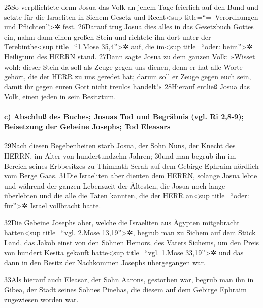 25So verpflichtete denn Josua das Volk an jenem Tage feierlich auf den
Bund und setzte für die Israeliten in Sichem Gesetz und
Recht\textless sup title=``=~Verordnungen und Pflichten''\textgreater✲
fest. 26Darauf trug Josua dies alles in das Gesetzbuch Gottes ein, nahm
dann einen großen Stein und richtete ihn dort unter der
Terebinthe\textless sup title=``1.Mose 35,4''\textgreater✲ auf, die
im\textless sup title=``oder: beim''\textgreater✲ Heiligtum des HERRN
stand. 27Dann sagte Josua zu dem ganzen Volk: »Wisset wohl: dieser Stein
da soll als Zeuge gegen uns dienen, denn er hat alle Worte gehört, die
der HERR zu uns geredet hat; darum soll er Zeuge gegen euch sein, damit
ihr gegen euren Gott nicht treulos handelt!« 28Hierauf entließ Josua das
Volk, einen jeden in sein Besitztum.

\hypertarget{c-abschluuxdf-des-buches-josuas-tod-und-begruxe4bnis-vgl.-ri-28-9-beisetzung-der-gebeine-josephs-tod-eleasars}{%
\paragraph{c) Abschluß des Buches; Josuas Tod und Begräbnis (vgl. Ri
2,8-9); Beisetzung der Gebeine Josephs; Tod
Eleasars}\label{c-abschluuxdf-des-buches-josuas-tod-und-begruxe4bnis-vgl.-ri-28-9-beisetzung-der-gebeine-josephs-tod-eleasars}}

29Nach diesen Begebenheiten starb Josua, der Sohn Nuns, der Knecht des
HERRN, im Alter von hundertundzehn Jahren; 30und man begrub ihn im
Bereich seines Erbbesitzes zu Thimnath-Serah auf dem Gebirge Ephraim
nördlich vom Berge Gaas. 31Die Israeliten aber dienten dem HERRN,
solange Josua lebte und während der ganzen Lebenszeit der Ältesten, die
Josua noch lange überlebten und die alle die Taten kannten, die der HERR
an\textless sup title=``oder: für''\textgreater✲ Israel vollbracht
hatte.

32Die Gebeine Josephs aber, welche die Israeliten aus Ägypten
mitgebracht hatten\textless sup title=``vgl. 2.Mose
13,19''\textgreater✲, begrub man zu Sichem auf dem Stück Land, das Jakob
einst von den Söhnen Hemors, des Vaters Sichems, um den Preis von
hundert Kesita gekauft hatte\textless sup title=``vgl. 1.Mose
33,19''\textgreater✲ und das dann in den Besitz der Nachkommen Josephs
übergegangen war.

33Als hierauf auch Eleasar, der Sohn Aarons, gestorben war, begrub man
ihn in Gibea, der Stadt seines Sohnes Pinehas, die diesem auf dem
Gebirge Ephraim zugewiesen worden war.
